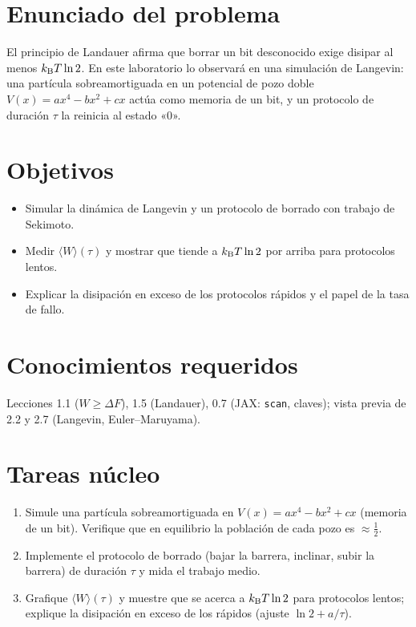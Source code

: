 \documentclass[11pt,a4paper]{article}
\begin{document}

\section*{Enunciado del problema}
El principio de Landauer afirma que borrar un bit desconocido exige disipar al menos $k_{\mathrm B} T\ln2$. En este laboratorio
lo observará en una simulación de Langevin: una partícula sobreamortiguada en un potencial de pozo doble
$V(x)=ax^4-bx^2+cx$ actúa como memoria de un bit, y un protocolo de duración $\tau$ la reinicia al estado «0».

\section*{Objetivos}
\begin{itemize}[nosep]
\item Simular la dinámica de Langevin y un protocolo de borrado con trabajo de Sekimoto.
\item Medir $\langle W\rangle(\tau)$ y mostrar que tiende a $k_{\mathrm B} T\ln2$ por arriba para protocolos lentos.
\item Explicar la disipación en exceso de los protocolos rápidos y el papel de la tasa de fallo.
\end{itemize}

\section*{Conocimientos requeridos}
Lecciones 1.1 ($W\ge\Delta F$), 1.5 (Landauer), 0.7 (JAX: \texttt{scan}, claves); vista previa de 2.2 y 2.7 (Langevin, Euler--Maruyama).

\section*{Tareas núcleo}
\begin{enumerate}
\item Simule una partícula sobreamortiguada en $V(x)=ax^4-bx^2+cx$ (memoria de un bit). Verifique que en equilibrio la población de cada pozo es $\approx\frac12$.
\item Implemente el protocolo de borrado (bajar la barrera, inclinar, subir la barrera) de duración $\tau$ y mida el trabajo medio.
\item Grafique $\langle W\rangle(\tau)$ y muestre que se acerca a $k_{\mathrm B} T\ln2$ para protocolos lentos; explique la disipación en exceso de los rápidos (ajuste $\ln2+a/\tau$).
\end{enumerate}
\end{document}
